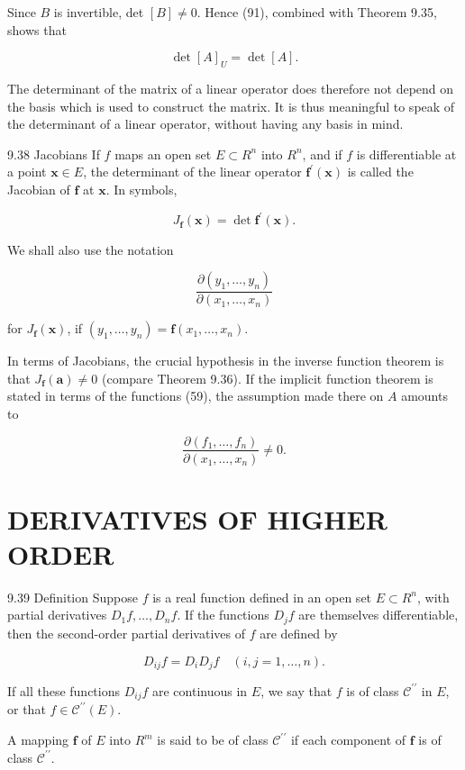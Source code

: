 \documentclass[10pt]{article}
\begin{document}
Since $B$ is invertible, det $[B] \neq 0$. Hence (91), combined with Theorem 9.35, shows that

$$
\operatorname{det}[A]_{U}=\operatorname{det}[A] .
$$

The determinant of the matrix of a linear operator does therefore not depend on the basis which is used to construct the matrix. It is thus meaningful to speak of the determinant of a linear operator, without having any basis in mind.

9.38 Jacobians If $f$ maps an open set $E \subset R^{n}$ into $R^{n}$, and if $f$ is differentiable at a point $\mathbf{x} \in E$, the determinant of the linear operator $\mathbf{f}^{\prime}(\mathbf{x})$ is called the Jacobian of $\mathbf{f}$ at $\mathbf{x}$. In symbols,

$$
J_{\mathbf{f}}(\mathbf{x})=\operatorname{det} \mathbf{f}^{\prime}(\mathbf{x}) .
$$

We shall also use the notation

$$
\frac{\partial\left(y_{1}, \ldots, y_{n}\right)}{\partial\left(x_{1}, \ldots, x_{n}\right)}
$$

for $J_{\mathbf{f}}(\mathbf{x})$, if $\left(y_{1}, \ldots, y_{n}\right)=\mathbf{f}\left(x_{1}, \ldots, x_{n}\right)$.

In terms of Jacobians, the crucial hypothesis in the inverse function theorem is that $J_{\mathbf{f}}(\mathbf{a}) \neq 0$ (compare Theorem 9.36). If the implicit function theorem is stated in terms of the functions (59), the assumption made there on $A$ amounts to

$$
\frac{\partial\left(f_{1}, \ldots, f_{n}\right)}{\partial\left(x_{1}, \ldots, x_{n}\right)} \neq 0 .
$$

\section{DERIVATIVES OF HIGHER ORDER}
9.39 Definition Suppose $f$ is a real function defined in an open set $E \subset R^{n}$, with partial derivatives $D_{1} f, \ldots, D_{n} f$. If the functions $D_{j} f$ are themselves differentiable, then the second-order partial derivatives of $f$ are defined by

$$
D_{i j} f=D_{i} D_{j} f \quad(i, j=1, \ldots, n) .
$$

If all these functions $D_{i j} f$ are continuous in $E$, we say that $f$ is of class $\mathscr{C}^{\prime \prime}$ in $E$, or that $f \in \mathscr{C}^{\prime \prime}(E)$.

A mapping $\mathbf{f}$ of $E$ into $R^{m}$ is said to be of class $\mathscr{C}^{\prime \prime}$ if each component of $\mathbf{f}$ is of class $\mathscr{C}^{\prime \prime}$.
\end{document}
